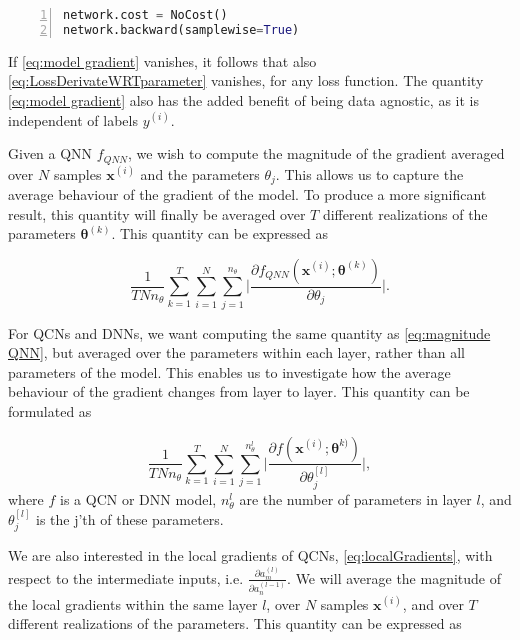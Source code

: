 \begin{lstlisting}[language=python, numbers=left]
network.cost = NoCost()
network.backward(samplewise=True)
\end{lstlisting}

If \autoref{eq:model gradient} vanishes, it follows that also \autoref{eq:LossDerivateWRTparameter} vanishes, for any loss function. The quantity \autoref{eq:model gradient} also has the added benefit of being data agnostic, as it is independent of labels $y^{(i)}$.

Given a QNN $f_{QNN}$, we wish to compute the magnitude of the gradient averaged over $N$ samples $\boldsymbol{x}^{(i)}$ and the parameters $\theta_j$. This allows us to capture the average behaviour of the gradient of the model. To produce a more significant result, this quantity will finally be averaged over $T$ different realizations of the parameters $\boldsymbol{\theta}^{(k)}$. This quantity can be expressed as

\begin{equation}\label{eq:magnitude QNN}
    \frac{1}{TNn_{\theta}}\sum_{k=1}^T\sum_{i=1}^N \sum_{j=1}^{n_{\theta}}\big|\frac{\partial f_{QNN}(\boldsymbol{x}^{(i)};\boldsymbol{\theta}^{(k)})}{\partial \theta_j}\big|.
\end{equation}

For QCNs and DNNs, we want computing the same quantity as \autoref{eq:magnitude QNN}, but averaged over the parameters within each layer, rather than all parameters of the model. This enables us to investigate how the average behaviour of the gradient changes from layer to layer. This quantity can be formulated as

\begin{equation}\label{eq:magnitude QCN DNN}
    \frac{1}{TNn_{\theta}}\sum_{k=1}^T\sum_{i=1}^N \sum_{j=1}^{n_{\theta}^{l}}\big|\frac{\partial f(\boldsymbol{x}^{(i)};\boldsymbol{\theta}^{k)})}{\partial \theta^{[l]}_j}\big|,
\end{equation}
where $f$ is a QCN or DNN model, $n_{\theta}^{l}$ are the number of parameters in layer $l$, and $\theta^{[l]}_j$ is the j'th of these parameters.


We are also interested in the local gradients of QCNs, \autoref{eq:localGradients}, with respect to the intermediate inputs, i.e. $\frac{\partial a_{m}^{(l)}}{\partial a_{n}^{(l-1)}}$. We will average the magnitude of the local gradients within the same layer $l$, over $N$ samples $\boldsymbol{x}^{(i)}$, and over $T$ different realizations of the parameters. This quantity can be expressed as 

